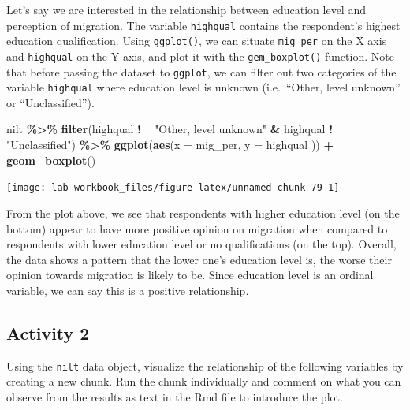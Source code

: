 \documentclass[
]{book}
\newenvironment{Shaded}{\begin{snugshade}}{\end{snugshade}}
\newcommand{\AttributeTok}[1]{\textcolor[rgb]{0.13,0.29,0.53}{#1}}
\newcommand{\FunctionTok}[1]{\textcolor[rgb]{0.13,0.29,0.53}{\textbf{#1}}}
\newcommand{\NormalTok}[1]{#1}
\newcommand{\SpecialCharTok}[1]{\textcolor[rgb]{0.81,0.36,0.00}{\textbf{#1}}}
\newcommand{\StringTok}[1]{\textcolor[rgb]{0.31,0.60,0.02}{#1}}
\begin{document}
Let's say we are interested in the relationship between education level and perception of migration. The variable \texttt{highqual} contains the respondent's highest education qualification. Using \texttt{ggplot()}, we can situate \texttt{mig\_per} on the X axis and \texttt{highqual} on the Y axis, and plot it with the \texttt{gem\_boxplot()} function. Note that before passing the dataset to \texttt{ggplot}, we can filter out two categories of the variable \texttt{highqual} where education level is unknown (i.e.~``Other, level unknown'' or ``Unclassified'').

\begin{Shaded}
\begin{Highlighting}[]
\NormalTok{nilt }\SpecialCharTok{\%\textgreater{}\%} 
  \FunctionTok{filter}\NormalTok{(highqual }\SpecialCharTok{!=} \StringTok{"Other, level unknown"} \SpecialCharTok{\&}\NormalTok{ highqual }\SpecialCharTok{!=} \StringTok{"Unclassified"}\NormalTok{) }\SpecialCharTok{\%\textgreater{}\%} 
  \FunctionTok{ggplot}\NormalTok{(}\FunctionTok{aes}\NormalTok{(}\AttributeTok{x =}\NormalTok{ mig\_per, }\AttributeTok{y =}\NormalTok{ highqual )) }\SpecialCharTok{+}
  \FunctionTok{geom\_boxplot}\NormalTok{()}
\end{Highlighting}
\end{Shaded}

\begin{flushleft}\texttt{[image: lab-workbook\_files/figure-latex/unnamed-chunk-79-1]} \end{flushleft}

From the plot above, we see that respondents with higher education level (on the bottom) appear to have more positive opinion on migration when compared to respondents with lower education level or no qualifications (on the top). Overall, the data shows a pattern that the lower one's education level is, the worse their opinion towards migration is likely to be. Since education level is an ordinal variable, we can say this is a positive relationship.

\hypertarget{activity-2-2}{%
\subsection{Activity 2}\label{activity-2-2}}

Using the \texttt{nilt} data object, visualize the relationship of the following variables by creating a new chunk. Run the chunk individually and comment on what you can observe from the results as text in the Rmd file to introduce the plot.
\end{document}
